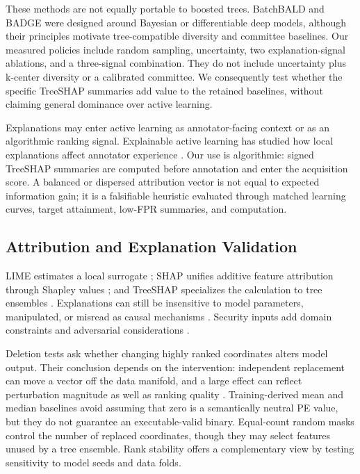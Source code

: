 These methods are not equally portable to boosted trees. BatchBALD and BADGE
were designed around Bayesian or differentiable deep models, although their
principles motivate tree-compatible diversity and committee baselines. Our
measured policies include random sampling, uncertainty, two explanation-signal
ablations, and a three-signal combination. They do not include uncertainty plus
k-center diversity or a calibrated committee. We consequently test whether the
specific TreeSHAP summaries add value to the retained baselines, without claiming
general dominance over active learning.

Explanations may enter active learning as annotator-facing context or as an
algorithmic ranking signal. Explainable active learning has studied how local
explanations affect annotator experience \cite{ghai2021explainable}. Our use is
algorithmic: signed TreeSHAP summaries are computed before annotation and enter
the acquisition score. A balanced or dispersed attribution vector is not equal
to expected information gain; it is a falsifiable heuristic evaluated through
matched learning curves, target attainment, low-FPR summaries, and computation.

\subsection{Attribution and Explanation Validation}

LIME estimates a local surrogate \cite{ribeiro2016why}; SHAP unifies additive
feature attribution through Shapley values \cite{lundberg2017unified}; and
TreeSHAP specializes the calculation to tree ensembles
\cite{lundberg2020local}. Explanations can still be insensitive to model
parameters, manipulated, or misread as causal mechanisms
\cite{adebayo2018sanity,slack2020fooling}. Security inputs add domain constraints
and adversarial considerations \cite{warnecke2020evaluating}.

Deletion tests ask whether changing highly ranked coordinates alters model
output. Their conclusion depends on the intervention: independent replacement
can move a vector off the data manifold, and a large effect can reflect
perturbation magnitude as well as ranking quality
\cite{hooker2019benchmark,yeh2019infidelity}. Training-derived mean and median
baselines avoid assuming that zero is a semantically neutral PE value, but they
do not guarantee an executable-valid binary. Equal-count random masks control
the number of replaced coordinates, though they may select features unused by a
tree ensemble. Rank stability offers a complementary view by testing sensitivity
to model seeds and data folds.

